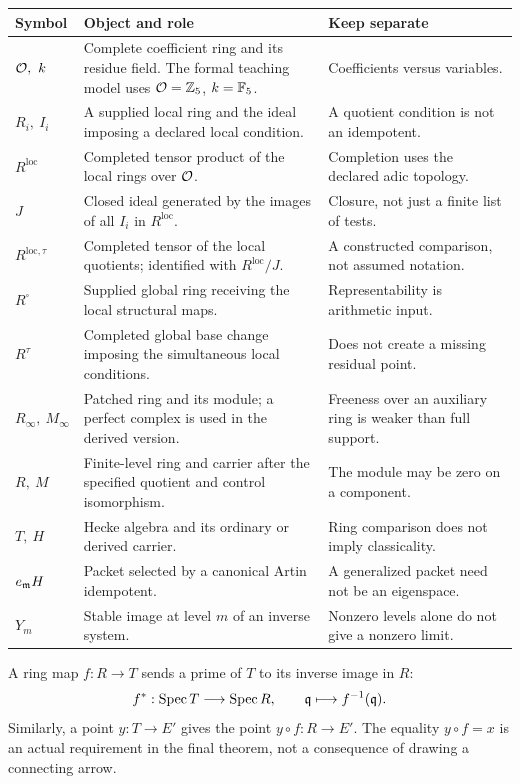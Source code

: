 {\small
\begin{tabularx}{\linewidth}{@{}p{.20\linewidth}Yp{.22\linewidth}@{}}\toprule
\textbf{Symbol} & \textbf{Object and role} & \textbf{Keep separate}\\\midrule
$\mathcal O,\ k$ & Complete coefficient ring and its residue field. The formal teaching model uses $\mathcal O=\mathbb Z_5$, $k=\mathbb F_5$. & Coefficients versus variables.\\
$R_i,\ I_i$ & A supplied local ring and the ideal imposing a declared local condition. & A quotient condition is not an idempotent.\\
$R^{\mathrm{loc}}$ & Completed tensor product of the local rings over $\mathcal O$. & Completion uses the declared adic topology.\\
$J$ & Closed ideal generated by the images of all $I_i$ in $R^{\mathrm{loc}}$. & Closure, not just a finite list of tests.\\
$R^{\mathrm{loc},\tau}$ & Completed tensor of the local quotients; identified with $R^{\mathrm{loc}}/J$. & A constructed comparison, not assumed notation.\\
$R^\square$ & Supplied global ring receiving the local structural maps. & Representability is arithmetic input.\\
$R^\tau$ & Completed global base change imposing the simultaneous local conditions. & Does not create a missing residual point.\\
$R_\infty,\ M_\infty$ & Patched ring and its module; a perfect complex is used in the derived version. & Freeness over an auxiliary ring is weaker than full support.\\
$R,\ M$ & Finite-level ring and carrier after the specified quotient and control isomorphism. & The module may be zero on a component.\\
$T,\ H$ & Hecke algebra and its ordinary or derived carrier. & Ring comparison does not imply classicality.\\
$e_{\mathfrak m}H$ & Packet selected by a canonical Artin idempotent. & A generalized packet need not be an eigenspace.\\
$Y_m$ & Stable image at level $m$ of an inverse system. & Nonzero levels alone do not give a nonzero limit.\\\bottomrule
\end{tabularx}}

A ring map $f:R\to T$ sends a prime of $T$ to its inverse image in $R$:
\[
f^*:\operatorname{Spec} T\longrightarrow\operatorname{Spec} R,\qquad \mathfrak q\longmapsto f^{-1}(\mathfrak q).
\]
Similarly, a point $y:T\to E'$ gives the point $y\circ f:R\to E'$. The equality $y\circ f=x$ is an actual requirement in the final theorem, not a consequence of drawing a connecting arrow.

